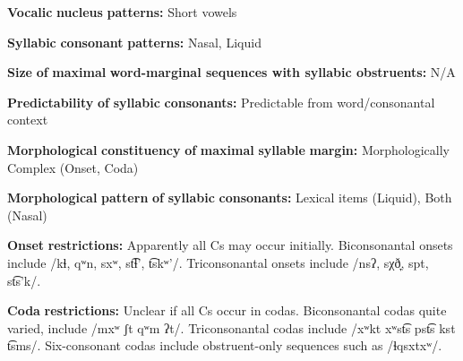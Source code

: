 \begin{styleBody}
\textbf{Vocalic} \textbf{nucleus} \textbf{patterns:} Short vowels
\end{styleBody}

\begin{styleBody}
\textbf{Syllabic} \textbf{consonant} \textbf{patterns:} Nasal, Liquid
\end{styleBody}

\begin{styleBody}
\textbf{Size} \textbf{of} \textbf{maximal} \textbf{word{}-marginal sequences with syllabic obstruents:} N/A
\end{styleBody}

\begin{styleBody}
\textbf{Predictability} \textbf{of} \textbf{syllabic} \textbf{consonants:} Predictable from word/consonantal context
\end{styleBody}

\begin{styleBody}
\textbf{Morphological} \textbf{constituency} \textbf{of} \textbf{maximal} \textbf{syllable} \textbf{margin:} Morphologically Complex (Onset, Coda)
\end{styleBody}

\begin{styleBody}
\textbf{Morphological} \textbf{pattern} \textbf{of} \textbf{syllabic} \textbf{consonants:} Lexical items (Liquid), Both (Nasal)
\end{styleBody}

\begin{styleBody}
\textbf{Onset} \textbf{restrictions:} Apparently all Cs may occur initially. Biconsonantal onsets include /kɬ, qʷn, sxʷ, st͡ɬ’, t͡skʷ’/. Triconsonantal onsets include /nsʔ, sχð̞, spt, st͡s’k/.
\end{styleBody}

\begin{styleBody}
\textbf{Coda} \textbf{restrictions:} Unclear if all Cs occur in codas. Biconsonantal codas quite varied, include /mxʷ ʃt qʷm ʔt/. Triconsonantal codas include /xʷkt xʷst͡s pst͡s kst t͡sms/. Six-consonant codas include obstruent-only sequences such as /ɬqsxtxʷ/.
\end{styleBody}

